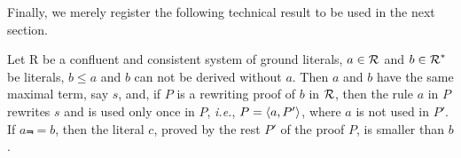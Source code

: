 %
%

Finally, we merely register the following technical result to be used in the next section.
\begin{LEMMA} \label {le:first-rule}
Let \C R be a confluent and consistent system of ground literals, \(a\in \mbox{$\cal R$}\)
and \(b\in\mbox{$\cal R$}^\ast\) be literals, \(b\leq a\) and $b$ can not be derived
without $a$. Then $a$ and $b$ have the same maximal term, say $s$, and, if $P$
is a rewriting proof of $b$ in $\mbox{$\cal R$}$, then the rule $a$
in $P$ rewrites $s$ and is used only once in $P$,
{\em i.e.}, \(P=\langle a,P'\rangle\), where $a$ is not used in $P'$. If \(a\Not= b\), 
then the literal \(c\), proved by the rest $P'$ of the proof $P$, 
is smaller than $b$.
\end{LEMMA}

%

